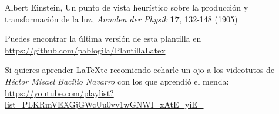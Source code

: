\documentclass[12pt,a4paper]{article}
\begin{document}



\newpage









\begin{thebibliography}{99} %

 Albert Einstein, Un punto de vista heurístico sobre la producción y transformación de la luz, \textit{Annalen der Physik} \textbf{17}, 132-148 (1905)

 Puedes encontrar la última versión de esta plantilla en \url{https://github.com/pablogila/PlantillaLatex}

 Si quieres aprender \LaTeX te recomiendo echarle un ojo a los videotutos de \textit{Héctor Misael Bacilio Navarro} con los que aprendió el menda: \url{https://youtube.com/playlist?list=PLKRmVEXGjGWcUu0vv1wGNWI_xAtE_yiE_}

\end{thebibliography}
\end{document}
